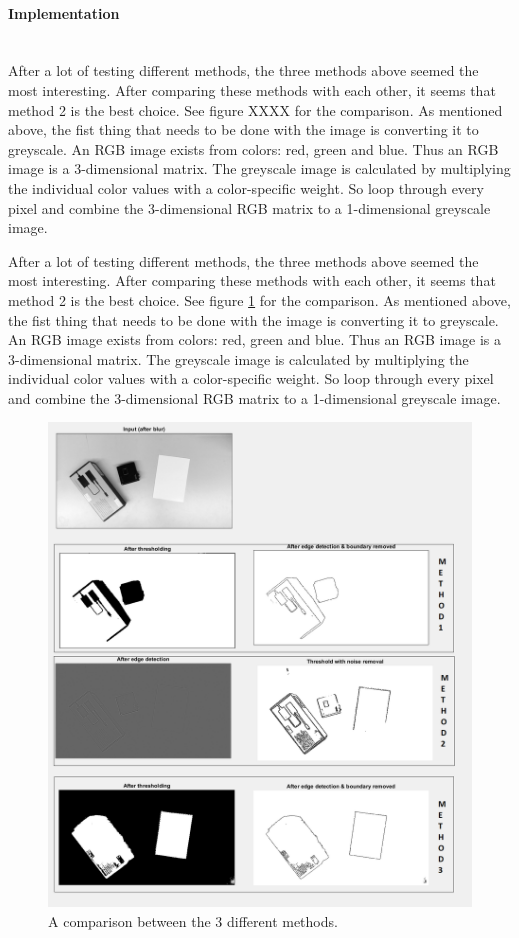 \documentclass[11pt]{article}
\begin{document}
\paragraph{Implementation}\mbox{}\\
After a lot of testing different methods, the three methods above seemed the most interesting. After comparing these methods with each other, it seems that method 2 is the best choice. See figure XXXX for the comparison. As mentioned above, the fist thing that needs to be done with the image is converting it to greyscale. An RGB image exists from colors: red, green and blue. Thus an RGB image is a 3-dimensional matrix. The greyscale image is calculated by multiplying the individual color values with a color-specific weight. So loop through every pixel and combine the 3-dimensional RGB matrix to a 1-dimensional greyscale image.

After a lot of testing different methods, the three methods above seemed the most interesting. After comparing these methods with each other, it seems that method 2 is the best choice. See figure \ref{fig:comparison_methods} for the comparison. As mentioned above, the fist thing that needs to be done with the image is converting it to greyscale. An RGB image exists from colors: red, green and blue. Thus an RGB image is a 3-dimensional matrix. The greyscale image is calculated by multiplying the individual color values with a color-specific weight. So loop through every pixel and combine the 3-dimensional RGB matrix to a 1-dimensional greyscale image.
\begin{figure}[h]
	\center
  \includegraphics[width=0.7\linewidth]{comparison_methods.png}
  \caption{A comparison between the 3 different methods.}
  \label{fig:comparison_methods}
\end{figure}
\end{document}
